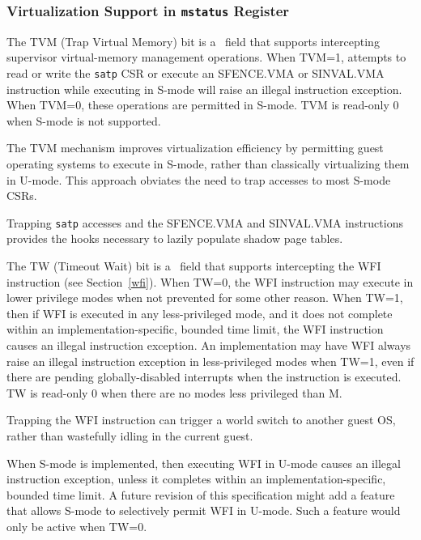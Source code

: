 \subsubsection{Virtualization Support in {\tt mstatus} Register}
\label{virt-control}

The TVM (Trap Virtual Memory) bit is a \warl\ field that supports intercepting
supervisor virtual-memory management operations.  When TVM=1,
attempts to read or write the {\tt satp} CSR or execute an SFENCE.VMA or
SINVAL.VMA instruction while executing in S-mode will raise an illegal instruction
exception.  When TVM=0, these operations are permitted in S-mode.
TVM is read-only 0 when S-mode is not supported.

\begin{commentary}
The TVM mechanism improves virtualization efficiency by permitting guest
operating systems to execute in S-mode, rather than classically virtualizing
them in U-mode.  This approach obviates the need to trap accesses to most
S-mode CSRs.

Trapping {\tt satp} accesses and the SFENCE.VMA and SINVAL.VMA instructions
provides the hooks necessary to lazily populate shadow page tables.
\end{commentary}

The TW (Timeout Wait) bit is a \warl\ field that supports intercepting the WFI
instruction (see Section~\ref{wfi}).
When TW=0, the WFI instruction may execute in lower
privilege modes when not prevented for some other reason.  When TW=1,
then if WFI is executed in any less-privileged mode, and it does not complete
within an implementation-specific, bounded time limit, the WFI instruction
causes an illegal instruction exception.
An implementation may have WFI always raise an illegal instruction exception
in less-privileged modes when TW=1, even if there are pending
globally-disabled interrupts when the instruction is executed.
TW is read-only 0 when there are no modes less privileged than
M.

\begin{commentary}
Trapping the WFI
instruction can trigger a world switch to another guest OS, rather than
wastefully idling in the current guest.
\end{commentary}

When S-mode is implemented, then executing WFI in U-mode causes an illegal
instruction exception, unless it completes within an implementation-specific,
bounded time limit.  A future revision of this specification might add
a feature that allows S-mode to selectively permit WFI in U-mode.  Such
a feature would only be active when TW=0.


